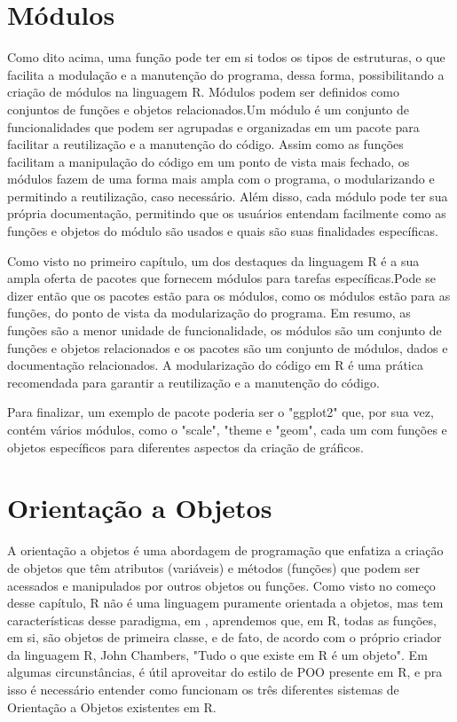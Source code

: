     \section{M\'{o}dulos}
	Como dito acima, uma função pode ter em si todos os tipos de estruturas, o que facilita a modulação e a manutenção do programa, dessa forma, possibilitando a criação de módulos na linguagem R. Módulos podem ser definidos como conjuntos de funções e objetos relacionados.Um módulo é um conjunto de funcionalidades que podem ser agrupadas e organizadas em um pacote para facilitar a reutilização e a manutenção do código. Assim como as funções facilitam a manipulação do código em um ponto de vista mais fechado, os módulos fazem de uma forma mais ampla com o programa, o modularizando e permitindo a reutilização, caso necessário. Além disso, cada módulo pode ter sua própria documentação, permitindo que os usuários entendam facilmente como as funções e objetos do módulo são usados e quais são suas finalidades específicas.\par 
	Como visto no primeiro capítulo, um dos destaques da linguagem R é a sua ampla oferta de pacotes que fornecem módulos para tarefas específicas.Pode se dizer então que os pacotes estão para os módulos, como os módulos estão para as funções, do ponto de vista da modularização do programa. Em resumo, as funções são a menor unidade de funcionalidade, os módulos são um conjunto de funções e objetos relacionados e os pacotes são um conjunto de módulos, dados e documentação relacionados. A modularização do código em R é uma prática recomendada para garantir a reutilização e a manutenção do código.\par 
	Para finalizar, um exemplo de pacote poderia ser o "ggplot2" que, por sua vez, contém vários módulos, como o "scale", "theme e "geom", cada um com funções e objetos específicos para diferentes aspectos da criação de gráficos.


    \section{Orienta\c{c}\~{a}o a Objetos}
	A orientação a objetos é uma abordagem de programação que enfatiza a criação de objetos que têm atributos (variáveis) e métodos (funções) que podem ser acessados e manipulados por outros objetos ou funções.
	Como visto no começo desse capítulo, R não é uma linguagem puramente orientada a objetos, mas tem características desse paradigma, em \cite{Cotton2013}, aprendemos que, em R, todas as funções, em si, são objetos de primeira classe, e de fato, de acordo com o próprio criador da linguagem R, John Chambers, "Tudo o que existe em R é um objeto". Em algumas circunstâncias, é útil aproveitar do estilo de POO presente em R, e pra isso é necessário entender como funcionam os três diferentes sistemas de Orientação a Objetos existentes em R.

